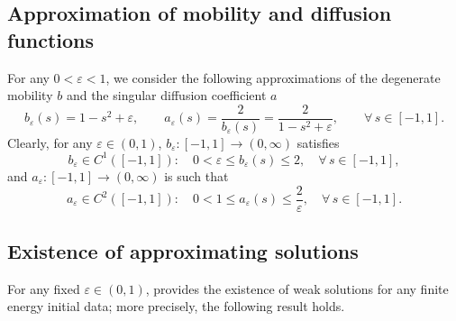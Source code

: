 \documentclass[11pt,  reqno]{amsart}%
\theoremstyle{plain}
\theoremstyle{definition}
\theoremstyle{remark}
\numberwithin{equation}{section}
\newcommand{\ve}{\varepsilon}
\begin{document}
\subsection{Approximation of mobility and diffusion functions}
For any $0<\ve<1 $, we consider the following approximations of the degenerate mobility $b$ and the singular diffusion coefficient $a$
\begin{equation}
\label{a-b-def}
b_{\ve}(s) = 1-s^2+\ve, 
\qquad
a_{\ve}(s) = \dfrac{2}{b_{\ve}(s)}=\dfrac{2}{1-s^2+\ve}, \qquad \forall \, s \in [-1,1].
\end{equation}
Clearly, for any $\ve \in (0,1)$, $b_{\ve}: [-1,1]\rightarrow (0,\infty)$ satisfies
$$
b_{\ve} \in C^1([-1,1]): \quad0<\ve \le b_{\ve}(s) \leq 2, \quad \forall \, s \in [-1,1],
$$
and $a_{\ve}:[-1,1] \rightarrow(0,\infty)$ is such that
$$
a_{\ve} \in C^2([-1,1]): \quad 0< 1 \le a_{\varepsilon}(s) \le \frac{2}{\varepsilon},\quad  \forall \, s \in [-1,1].
$$

\subsection{Existence of approximating solutions}
For any fixed $\ve \in (0,1)$, \cite[Theorem 1.3]{CGGS2025} provides the existence of weak solutions for any finite energy initial data; more precisely, the following result holds. 
	
\end{document}
